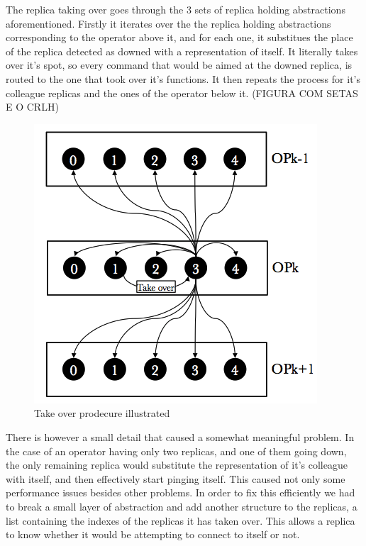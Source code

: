 \documentclass[times, 10pt,twocolumn]{article}
\begin{document}

The replica taking over goes through the 3 sets of replica holding
abstractions aforementioned.  Firstly it iterates over the the replica
holding abstractions corresponding to the operator above it, and for each
one, it substitues the place of the replica detected as downed with a
representation of itself. It literally takes over it's spot, so every
command that would be aimed at the downed replica, is routed to the one
that took over it's functions.  It then repeats the process for it's
colleague replicas and the ones of the operator below it. (FIGURA COM
SETAS E O CRLH)

\begin{figure}[h] \includegraphics[width=\columnwidth]{take_over}
	\caption{Take over prodecure illustrated} \end{figure}

There is however a small detail that caused a somewhat meaningful problem.
In the case of an operator having only two replicas, and one of them going
down, the only remaining replica would substitute the representation of
it's colleague with itself, and then effectively start pinging itself.
This caused not only some performance issues besides other problems.  In
order to fix this efficiently we had to break a small layer of abstraction
and add another structure to the replicas, a list containing the indexes
of the replicas it has taken over. This allows a replica to know whether
it would be attempting to connect to itself or not.
\end{document}
